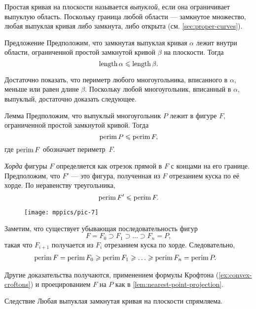 Простая кривая на плоскости называется \emph{выпуклой}, если она ограничивает выпуклую область.
Поскольку граница любой области --- замкнутое множество, любая выпуклая кривая либо замкнута, либо открыта (см. \ref{sec:proper-curves}).

\begin{thm}{Предложение}\label{prop:convex-curve}
Предположим, что замкнутая выпуклая кривая $\alpha$ лежит внутри области, ограниченной простой замкнутой кривой $\beta$ на плоскости.
Тогда
\[\mathop{\rm length}\nolimits\alpha\leqslant \mathop{\rm length}\nolimits\beta.\]
\end{thm}

Достаточно показать, что периметр любого многоугольника, вписанного в $\alpha$, меньше или равен длине $\beta$.
Поскольку любой многоугольник, вписанный в $\alpha$, выпуклый, достаточно доказать следующее.

\begin{thm}{Лемма}\label{lem:perimeter}
Предположим, что выпуклый многоугольник $P$ лежит в фигуре $F$, ограниченной простой замкнутой кривой.
Тогда
\[\mathop{\rm perim}\nolimits P\leqslant \mathop{\rm perim}\nolimits F,\]
где $\mathop{\rm perim}\nolimits F$ обозначает периметр~$F$.
\end{thm}

\emph{Хорда} фигуры $F$ определяется как отрезок прямой в $F$ с концами на его границе.
Предположим, что $F'$ --- это фигура, полученная из $F$ отрезанием куска по её хорде.
По неравенству треугольника,
\[\mathop{\rm perim}\nolimits F'\leqslant \mathop{\rm perim}\nolimits F.\]

\begin{wrapfigure}{o}{24 mm}
\vskip-10mm
\centering
\texttt{[image: mppics/pic-7]}
\vskip3mm
\end{wrapfigure}

Заметим, что существует убывающая последовательность фигур 
\[F=F_0\supset F_1\supset\dots\supset F_n=P,\]
такая что $F_{i+1}$ получается из $F_{i}$ отрезанием куска по хорде.
Следовательно, 
\begin{align*}
\perim F=\perim F_0&\ge\perim F_1\ge\dots\ge\perim F_n=\perim P.
\end{align*}
\qedsf

Другие доказательства получаются, применением формулы Крофтона (\ref{ex:convex-croftons}) и проецированием $F$ на $P$ как в \ref{lem:nearest-point-projection}.  

\begin{thm}{Следствие}\label{cor:convex=>rectifiable}
Любая выпуклая замкнутая кривая на плоскости спрямляема.
\end{thm}

